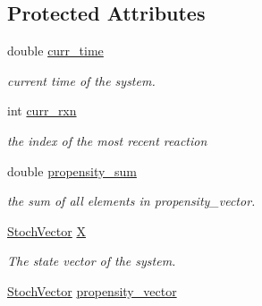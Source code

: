 \subsection*{Protected Attributes}
\begin{CompactItemize}
\item 
\hypertarget{class_base_system_0b1f2275eae779c34ae20da5dddfa960}{
double \hyperlink{class_base_system_0b1f2275eae779c34ae20da5dddfa960}{curr\_\-time}}
\label{class_base_system_0b1f2275eae779c34ae20da5dddfa960}

\begin{CompactList}\small\item\em current time of the system. \item\end{CompactList}\item 
\hypertarget{class_base_system_1b3491470dfa6332610ed83f953f86c6}{
int \hyperlink{class_base_system_1b3491470dfa6332610ed83f953f86c6}{curr\_\-rxn}}
\label{class_base_system_1b3491470dfa6332610ed83f953f86c6}

\begin{CompactList}\small\item\em the index of the most recent reaction \item\end{CompactList}\item 
\hypertarget{class_base_system_ef2522788abb1430d6d55bfdd0b15a0b}{
double \hyperlink{class_base_system_ef2522788abb1430d6d55bfdd0b15a0b}{propensity\_\-sum}}
\label{class_base_system_ef2522788abb1430d6d55bfdd0b15a0b}

\begin{CompactList}\small\item\em the sum of all elements in propensity\_\-vector. \item\end{CompactList}\item 
\hypertarget{class_base_system_1727d447a5fb8c717c72af8eb9ebe2c3}{
\hyperlink{class_stoch_vector}{StochVector} \hyperlink{class_base_system_1727d447a5fb8c717c72af8eb9ebe2c3}{X}}
\label{class_base_system_1727d447a5fb8c717c72af8eb9ebe2c3}

\begin{CompactList}\small\item\em The state vector of the system. \item\end{CompactList}\item 
\hypertarget{class_base_system_95055447038b0fcb98e032142c56ccb9}{
\hyperlink{class_stoch_vector}{StochVector} \hyperlink{class_base_system_95055447038b0fcb98e032142c56ccb9}{propensity\_\-vector}}
\label{class_base_system_95055447038b0fcb98e032142c56ccb9}


\end{CompactItemize}
